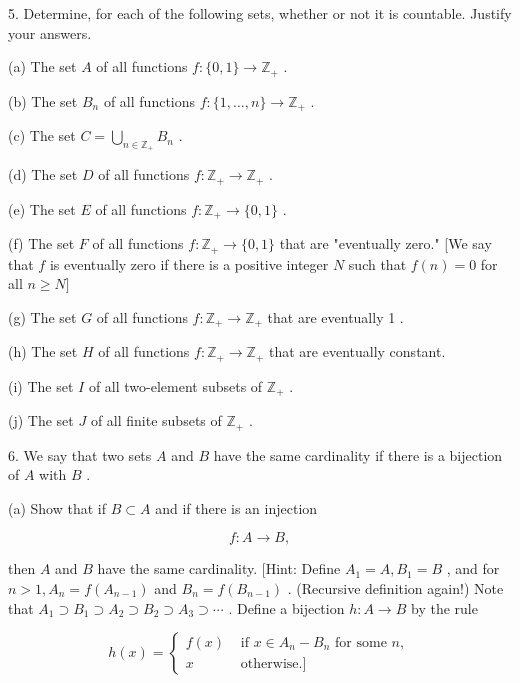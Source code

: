 \documentclass[10pt]{article}
\begin{document}
5. Determine, for each of the following sets, whether or not it is countable. Justify your answers.

(a) The set \(A\) of all functions \(f : \{ 0,1\}  \rightarrow  {\mathbb{Z}}_{ + }\) .

(b) The set \({B}_{n}\) of all functions \(f : \{ 1,\ldots ,n\}  \rightarrow  {\mathbb{Z}}_{ + }\) .

(c) The set \(C = \mathop{\bigcup }\limits_{{n \in  {\mathbb{Z}}_{ + }}}{B}_{n}\) .

(d) The set \(D\) of all functions \(f : {\mathbb{Z}}_{ + } \rightarrow  {\mathbb{Z}}_{ + }\) .

(e) The set \(E\) of all functions \(f : {\mathbb{Z}}_{ + } \rightarrow  \{ 0,1\}\) .

(f) The set \(F\) of all functions \(f : {\mathbb{Z}}_{ + } \rightarrow  \{ 0,1\}\) that are "eventually zero." [We say that \(f\) is eventually zero if there is a positive integer \(N\) such that \(f\left( n\right)  = 0\) for all \(n \geq  N\rbrack\)

(g) The set \(G\) of all functions \(f : {\mathbb{Z}}_{ + } \rightarrow  {\mathbb{Z}}_{ + }\) that are eventually 1 .

(h) The set \(H\) of all functions \(f : {\mathbb{Z}}_{ + } \rightarrow  {\mathbb{Z}}_{ + }\) that are eventually constant.

(i) The set \(I\) of all two-element subsets of \({\mathbb{Z}}_{ + }\) .

(j) The set \(J\) of all finite subsets of \({\mathbb{Z}}_{ + }\) .

6. We say that two sets \(A\) and \(B\) have the same cardinality if there is a bijection of \(A\) with \(B\) .

(a) Show that if \(B \subset  A\) and if there is an injection

\[
f : A \rightarrow  B,
\]

then \(A\) and \(B\) have the same cardinality. [Hint: Define \({A}_{1} = A,{B}_{1} = B\) , and for \(n > 1,{A}_{n} = f\left( {A}_{n - 1}\right)\) and \({B}_{n} = f\left( {B}_{n - 1}\right)\) . (Recursive definition again!) Note that \({A}_{1} \supset  {B}_{1} \supset  {A}_{2} \supset  {B}_{2} \supset  {A}_{3} \supset  \cdots\) . Define a bijection \(h : A \rightarrow  B\) by the rule

\[
h\left( x\right)  = \left\{  \begin{array}{ll} f\left( x\right) & \text{ if }x \in  {A}_{n} - {B}_{n}\text{ for some }n, \\  x & \text{ otherwise.] } \end{array}\right.
\]
\end{document}
